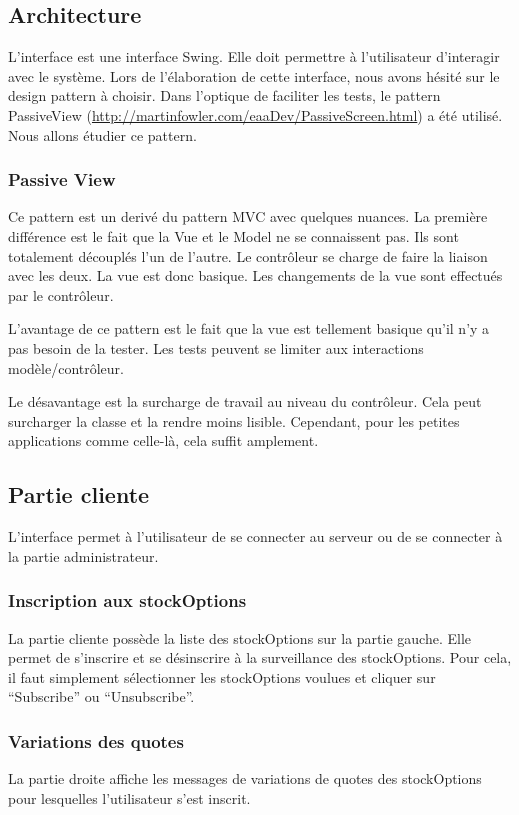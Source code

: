 \subsection{Architecture}
L'interface est une interface Swing. Elle doit permettre à l'utilisateur d'interagir avec le système. Lors de l'élaboration de cette interface, nous avons hésité sur le design pattern à choisir. Dans l'optique de faciliter les tests, le pattern PassiveView (\url{http://martinfowler.com/eaaDev/PassiveScreen.html}) a été utilisé. Nous allons étudier ce pattern.
\subsubsection{Passive View}
Ce pattern est un derivé du pattern MVC avec quelques nuances. La première différence est le fait que la Vue et le Model ne se connaissent pas. Ils sont totalement découplés l'un de l'autre. Le contrôleur se charge de faire la liaison avec les deux. La vue est donc basique. Les changements de la vue sont effectués par le contrôleur.

L'avantage de ce pattern est le fait que la vue est tellement basique qu'il n'y a pas besoin de la tester. Les tests peuvent se limiter aux interactions modèle/contrôleur.

Le désavantage est la surcharge de travail au niveau du contrôleur. Cela peut surcharger la classe et la rendre moins lisible. Cependant, pour les petites applications comme celle-là, cela suffit amplement.
\subsection{Partie cliente}
L'interface permet à l'utilisateur de se connecter au serveur ou de se connecter à la partie administrateur.
\subsubsection{Inscription aux stockOptions}
La partie cliente possède la liste des stockOptions sur la partie gauche. Elle permet de s'inscrire et se désinscrire à la surveillance des stockOptions. Pour cela, il faut simplement sélectionner les stockOptions voulues et cliquer sur ``Subscribe'' ou ``Unsubscribe''.
\subsubsection{Variations des quotes}
La partie droite affiche les messages de variations de quotes des stockOptions pour lesquelles l'utilisateur s'est inscrit.
